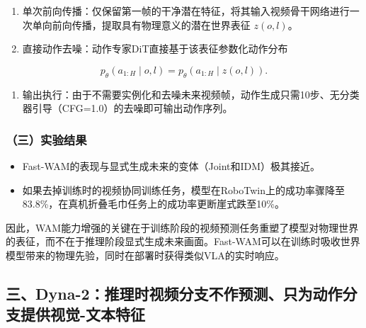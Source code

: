 \begin{enumerate}
\def\labelenumi{\arabic{enumi}.}
\tightlist
\item
  单次前向传播：仅保留第一帧的干净潜在特征，将其输入视频骨干网络进行一次单向前向传播，提取具有物理意义的潜在世界表征 \(z(o,l)\)。
\item
  直接动作去噪：动作专家DiT直接基于该表征参数化动作分布
\end{enumerate}

\[
p_\theta(a_{1:H}\mid o,l)=p_\theta(a_{1:H}\mid z(o,l)).
\]

\begin{enumerate}
\def\labelenumi{\arabic{enumi}.}
\setcounter{enumi}{2}
\tightlist
\item
  输出执行：由于不需要实例化和去噪未来视频帧，动作生成只需10步、无分类器引导（CFG=1.0）的去噪即可输出动作序列。
\end{enumerate}

\hypertarget{ux4e09ux5b9eux9a8cux7ed3ux679c}{%
\subsubsection{（三）实验结果}\label{ux4e09ux5b9eux9a8cux7ed3ux679c}}

\begin{itemize}
\tightlist
\item
  Fast-WAM的表现与显式生成未来的变体（Joint和IDM）极其接近。
\item
  如果去掉训练时的视频协同训练任务，模型在RoboTwin上的成功率骤降至83.8\%，在真机折叠毛巾任务上的成功率更断崖式跌至10\%。
\end{itemize}

因此，WAM能力增强的关键在于训练阶段的视频预测任务重塑了模型对物理世界的表征，而不在于推理阶段显式生成未来画面。Fast-WAM可以在训练时吸收世界模型带来的物理先验，同时在部署时获得类似VLA的实时响应。

\hypertarget{ux4e09dyna-2ux63a8ux7406ux65f6ux89c6ux9891ux5206ux652fux4e0dux4f5cux9884ux6d4bux53eaux4e3aux52a8ux4f5cux5206ux652fux63d0ux4f9bux89c6ux89c9-ux6587ux672cux7279ux5f81}{%
\subsection{三、Dyna-2：推理时视频分支不作预测、只为动作分支提供视觉-文本特征}\label{ux4e09dyna-2ux63a8ux7406ux65f6ux89c6ux9891ux5206ux652fux4e0dux4f5cux9884ux6d4bux53eaux4e3aux52a8ux4f5cux5206ux652fux63d0ux4f9bux89c6ux89c9-ux6587ux672cux7279ux5f81}}

